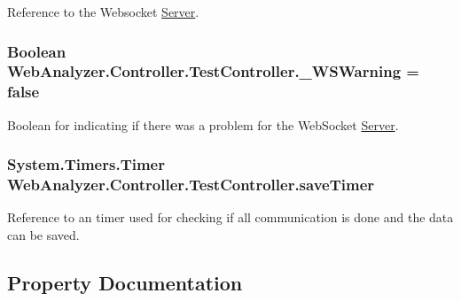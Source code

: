 Reference to the Websocket \hyperlink{namespace_web_analyzer_1_1_server}{Server}. 

\hypertarget{class_web_analyzer_1_1_controller_1_1_test_controller_a517bab0ee0c22871788bd498de86c27e}{}
\subsubsection[{\+\_\+\+W\+S\+Warning}]{\setlength{\rightskip}{0pt plus 5cm}Boolean Web\+Analyzer.\+Controller.\+Test\+Controller.\+\_\+\+W\+S\+Warning = {\bf false}\hspace{0.3cm}{\ttfamily [private]}}\label{class_web_analyzer_1_1_controller_1_1_test_controller_a517bab0ee0c22871788bd498de86c27e}


Boolean for indicating if there was a problem for the Web\+Socket \hyperlink{namespace_web_analyzer_1_1_server}{Server}. 

\hypertarget{class_web_analyzer_1_1_controller_1_1_test_controller_a484747e48ceb23e931111018ed87d8e1}{}
\subsubsection[{save\+Timer}]{\setlength{\rightskip}{0pt plus 5cm}System.\+Timers.\+Timer Web\+Analyzer.\+Controller.\+Test\+Controller.\+save\+Timer\hspace{0.3cm}{\ttfamily [private]}}\label{class_web_analyzer_1_1_controller_1_1_test_controller_a484747e48ceb23e931111018ed87d8e1}


Reference to an timer used for checking if all communication is done and the data can be saved. 



\subsection{Property Documentation}
\hypertarget{class_web_analyzer_1_1_controller_1_1_test_controller_a741cf98b95422a4a307bf8834db147b3}{}
